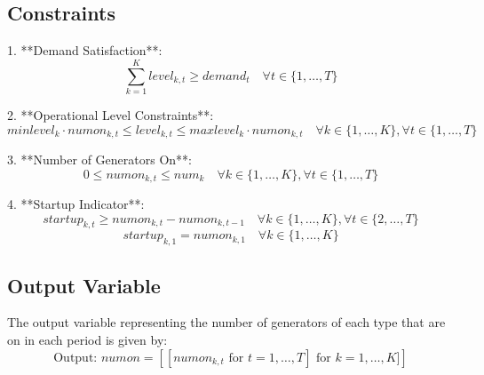 \documentclass{article}
\begin{document}
\subsection*{Constraints}

1. **Demand Satisfaction**:
\[
\sum_{k=1}^{K} level_{k,t} \geq demand_t \quad \forall t \in \{1, \ldots, T\}
\]

2. **Operational Level Constraints**:
\[
minlevel_k \cdot numon_{k,t} \leq level_{k,t} \leq maxlevel_k \cdot numon_{k,t} \quad \forall k \in \{1, \ldots, K\}, \forall t \in \{1, \ldots, T\}
\]

3. **Number of Generators On**:
\[
0 \leq numon_{k,t} \leq num_k \quad \forall k \in \{1, \ldots, K\}, \forall t \in \{1, \ldots, T\}
\]

4. **Startup Indicator**:
\[
startup_{k,t} \geq numon_{k,t} - numon_{k,t-1} \quad \forall k \in \{1, \ldots, K\}, \forall t \in \{2, \ldots, T\}
\]
\[
startup_{k,1} = numon_{k,1} \quad \forall k \in \{1, \ldots, K\}
\]

\subsection*{Output Variable}
The output variable representing the number of generators of each type that are on in each period is given by:
\[
\text{Output: } numon = \left[ [numon_{k,t} \text{ for } t=1,\ldots,T] \text{ for } k=1,\ldots,K] \right]
\]
\end{document}
